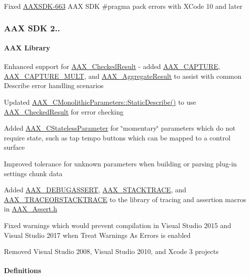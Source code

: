 \begin{DoxyItemize}
\item Fixed \mbox{\hyperlink{a00846_AAXSDK-663}{A\+A\+X\+S\+D\+K-\/663}} A\+AX S\+DK {\ttfamily \#pragma pack} errors with X\+Code 10 and later  
\end{DoxyItemize}\hypertarget{a00847_aax_sdk_2p3p1}{}\subsubsection{A\+A\+X S\+D\+K 2..}\label{a00847_aax_sdk_2p3p1}
\hypertarget{a00847_aax_sdk_2p3p1_AAXLibrary}{}\paragraph{A\+A\+X Library}\label{a00847_aax_sdk_2p3p1_AAXLibrary}

\begin{DoxyItemize}
\item Enhanced support for \mbox{\hyperlink{a01601}{A\+A\+X\+\_\+\+Checked\+Result}} -\/ added \mbox{\hyperlink{a00497_af9972551e4546e894010f99eade68c94}{A\+A\+X\+\_\+\+C\+A\+P\+T\+U\+RE}}, \mbox{\hyperlink{a00497_a078be92d3d19a5a4b3da2b55ae5ac1c9}{A\+A\+X\+\_\+\+C\+A\+P\+T\+U\+R\+E\+\_\+\+M\+U\+LT}}, and \mbox{\hyperlink{a01605}{A\+A\+X\+\_\+\+Aggregate\+Result}} to assist with common Describe error handling scenarios  
\item Updated \mbox{\hyperlink{a01969_a69f9b80a70ecc6b7b2a7eec372d2502a}{A\+A\+X\+\_\+\+C\+Monolithic\+Parameters\+::\+Static\+Describe()}} to use \mbox{\hyperlink{a01601}{A\+A\+X\+\_\+\+Checked\+Result}} for error checking  
\item Added \mbox{\hyperlink{a01541}{A\+A\+X\+\_\+\+C\+Stateless\+Parameter}} for \char`\"{}momentary\char`\"{} parameters which do not require state, such as tap tempo buttons which can be mapped to a control surface  
\item Improved tolerance for unknown parameters when building or parsing plug-\/in settings chunk data  
\item Added \mbox{\hyperlink{a00395_aa0253bd2994036fcfd6629ecf465d543}{A\+A\+X\+\_\+\+D\+E\+B\+U\+G\+A\+S\+S\+E\+RT}}, \mbox{\hyperlink{a00395_ae871829dd7297e4a5ae6c7094f6b5398}{A\+A\+X\+\_\+\+S\+T\+A\+C\+K\+T\+R\+A\+CE}}, and \mbox{\hyperlink{a00395_a96862f9cb28b6a49eb5dbd6da9975ed1}{A\+A\+X\+\_\+\+T\+R\+A\+C\+E\+O\+R\+S\+T\+A\+C\+K\+T\+R\+A\+CE}} to the library of tracing and assertion macros in \mbox{\hyperlink{a00395}{A\+A\+X\+\_\+\+Assert.\+h}}  
\item Fixed warnings which would prevent compilation in Visual Studio 2015 and Visual Studio 2017 when Treat Warnings As Errors is enabled  
\item Removed Visual Studio 2008, Visual Studio 2010, and Xcode 3 projects  
\end{DoxyItemize}\hypertarget{a00847_aax_sdk_2p3p1_Definitions}{}\paragraph{Definitions}\label{a00847_aax_sdk_2p3p1_Definitions}

